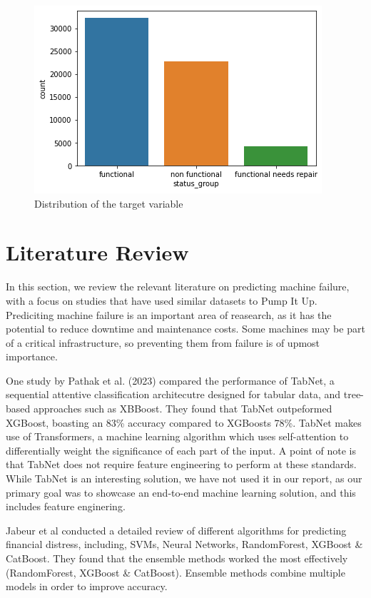 \documentclass[conference]{IEEEtran}
\begin{document}
\begin{figure}[h]
    \centering
    \includegraphics[scale=0.5]{figures/status_groups.png}
    \caption{Distribution of the target variable}
    \label{fig:status_groups}
\end{figure}

\section{Literature Review}

In this section, we review the relevant literature on predicting machine failure, with a focus on studies that have used similar datasets to Pump It Up. Prediciting machine failure is an important area of reasearch, as it has the potential to reduce downtime and maintenance costs. Some machines may be part of a critical infrastructure, so preventing them from failure is of upmost importance.

One study by Pathak et al. (2023) \cite{pathak2023pump} compared the performance of TabNet, a sequential attentive classification architecutre designed for tabular data, and tree-based approaches such as XBBoost. They found that TabNet outpeformed XGBoost, boasting an 83\% accuracy compared to XGBoosts 78\%. TabNet makes use of Transformers, a machine learning algorithm which uses self-attention to differentially weight the significance of each part of the input. A point of note is that TabNet does not require feature engineering to perform at these standards. While TabNet is an interesting solution, we have not used it in our report, as our primary goal was to showcase an end-to-end machine learning solution, and this includes feature enginering.

Jabeur et al \cite{JABEUR2021} conducted a detailed review of different algorithms for predicting financial distress, including, SVMs, Neural Networks, RandomForest, XGBoost \& CatBoost. They found that the ensemble methods worked the most effectively (RandomForest, XGBoost \& CatBoost). Ensemble methods combine multiple models in order to improve accuracy. 
\end{document}

